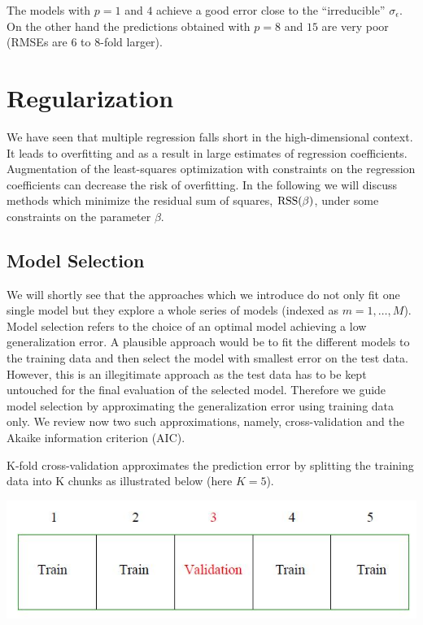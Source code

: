 \documentclass[
]{book}
\begin{document}
The models with \(p=1\) and \(4\) achieve a good error close to the ``irreducible'' \(\sigma_{\epsilon}\). On the other hand the predictions obtained with \(p=8\) and \(15\) are very poor (RMSEs are 6 to 8-fold larger).

\hypertarget{regularization}{%
\chapter{Regularization}\label{regularization}}

We have seen that multiple regression falls short in the high-dimensional context. It leads to overfitting and as a result in large estimates of regression coefficients. Augmentation of the least-squares optimization with constraints on the regression coefficients can decrease the risk of overfitting. In the following we will discuss methods which minimize the residual sum of squares, \(\rm{RSS}(\beta)\), under some constraints on the parameter \(\beta\).

\hypertarget{model-selection}{%
\section{Model Selection}\label{model-selection}}

We will shortly see that the approaches which we introduce do not only fit one single model but they explore a whole series of models (indexed as \(m=1,\ldots,M\)). Model selection refers to the choice of an optimal model achieving a low generalization error. A plausible approach would be to fit the different models to the training data and then select the model with smallest error on the test data. However, this is an illegitimate approach as the test data has to be kept untouched for the final evaluation of the selected model. Therefore we guide model selection by approximating the generalization error using training data only. We review now two such approximations, namely, cross-validation and the Akaike information criterion (AIC).

K-fold cross-validation approximates the prediction error by splitting the training data into K chunks as illustrated below (here \(K=5\)).

\begin{center}\includegraphics[width=0.8\linewidth]{crossvalidation} \end{center}
\end{document}
